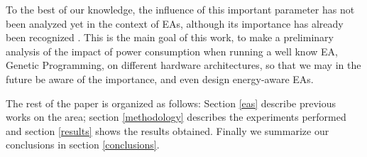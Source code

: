 To the best of our knowledge, the influence of this important
parameter has not been analyzed yet in the context of EAs, although
its importance has already been recognized \cite{ephemeral}.  This is
the main goal of this work, to make a preliminary analysis of the
impact of power consumption when running a well know EA, Genetic Programming, on different hardware architectures, so that we may in the future be aware of the
importance, and even design energy-aware EAs. 

The rest of the paper is organized as follows:  Section \ref{eas}
describe previous works on the area;  section \ref{methodology}
describes the experiments performed and section \ref{results} shows
the results obtained.  Finally we summarize our conclusions in section
\ref{conclusions}. 


